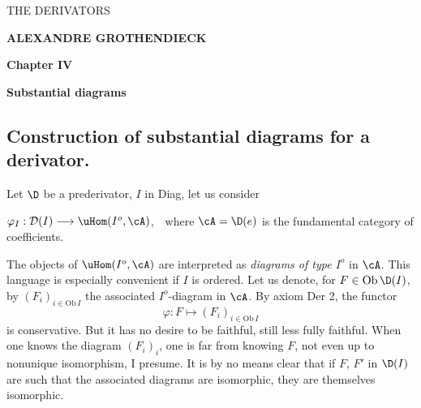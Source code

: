 \printedpage{}%

\begin{center}
{\LARGE\textsf{THE DERIVATORS}}

\bigskip

\textbf{ALEXANDRE GROTHENDIECK}

\bigskip\bigskip

\textbf{Chapter IV}

\medskip

\textbf{Substantial diagrams}
\end{center}

\clearpage

\printedpage{}%


\clearpage


\noindent


\subsection*{Construction of substantial diagrams for a derivator.}

\noindent Let $\D$ be a prederivator, $I$ in Diag, let us consider

\noindent $\varphi_I : \mathcal{D}(I) \longrightarrow \uHom(I^o,\cA)$,\ \ where $\cA=\D(e)$ is the fundamental category of coefficients. %

The objects of $\uHom(I^o,\cA)$ are interpreted as \textit{diagrams of type $I^o$} in $\cA$. This language is especially convenient if $I$ is ordered. Let us denote, for $F\in\mathrm{Ob}\,\D(I)$, by $(F_i)_{i\in\mathrm{Ob}\,I}$ the associated $I^o$-diagram in $\cA$. By axiom Der 2, the functor
\[
\varphi : F \longmapsto (F_i)_{i\in\mathrm{Ob}\,I}
\]
is conservative. But it has no desire to be faithful, still less fully faithful. When one knows the diagram $(F_i)_i$, one is far from knowing $F$, not even up to nonunique isomorphism, I presume. It is by no means clear that if $F$, $F'$ in $\D(I)$ are such that the associated diagrams are isomorphic, they are themselves isomorphic.

